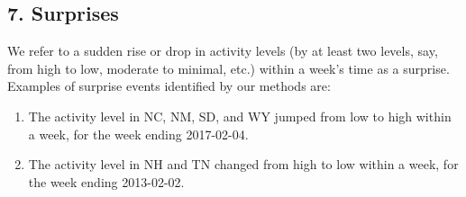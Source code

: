 \subsection*{7. Surprises}
We refer to a sudden rise or drop in activity levels (by at least two levels, say, from high to low, moderate to minimal, etc.) within a week's time as a surprise.
Examples of surprise events identified by our methods are:
\begin{enumerate}
\item 
The activity level in NC, NM, SD, and WY jumped from
low to high within a week, for the week ending 2017-02-04.
\item 
The activity level in NH and TN changed from high to low within a week,
for the week ending 2013-02-02.
\end{enumerate}
